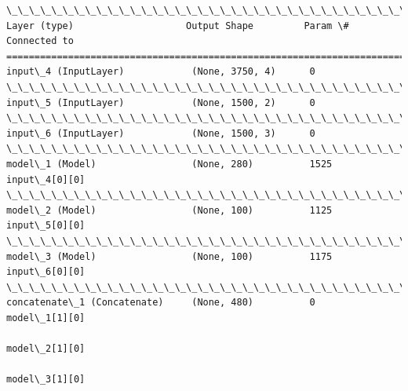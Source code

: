 \documentclass[11pt]{article}
\begin{document}
    \begin{Verbatim}[commandchars=\\\{\}]
\_\_\_\_\_\_\_\_\_\_\_\_\_\_\_\_\_\_\_\_\_\_\_\_\_\_\_\_\_\_\_\_\_\_\_\_\_\_\_\_\_\_\_\_\_\_\_\_\_\_\_\_\_\_\_\_\_\_\_\_\_\_\_\_\_\_\_\_\_\_\_\_\_\_\_\_\_\_\_\_\_\_\_\_\_\_\_\_\_\_\_\_\_\_\_\_\_\_
Layer (type)                    Output Shape         Param \#     Connected to                     
==================================================================================================
input\_4 (InputLayer)            (None, 3750, 4)      0                                            
\_\_\_\_\_\_\_\_\_\_\_\_\_\_\_\_\_\_\_\_\_\_\_\_\_\_\_\_\_\_\_\_\_\_\_\_\_\_\_\_\_\_\_\_\_\_\_\_\_\_\_\_\_\_\_\_\_\_\_\_\_\_\_\_\_\_\_\_\_\_\_\_\_\_\_\_\_\_\_\_\_\_\_\_\_\_\_\_\_\_\_\_\_\_\_\_\_\_
input\_5 (InputLayer)            (None, 1500, 2)      0                                            
\_\_\_\_\_\_\_\_\_\_\_\_\_\_\_\_\_\_\_\_\_\_\_\_\_\_\_\_\_\_\_\_\_\_\_\_\_\_\_\_\_\_\_\_\_\_\_\_\_\_\_\_\_\_\_\_\_\_\_\_\_\_\_\_\_\_\_\_\_\_\_\_\_\_\_\_\_\_\_\_\_\_\_\_\_\_\_\_\_\_\_\_\_\_\_\_\_\_
input\_6 (InputLayer)            (None, 1500, 3)      0                                            
\_\_\_\_\_\_\_\_\_\_\_\_\_\_\_\_\_\_\_\_\_\_\_\_\_\_\_\_\_\_\_\_\_\_\_\_\_\_\_\_\_\_\_\_\_\_\_\_\_\_\_\_\_\_\_\_\_\_\_\_\_\_\_\_\_\_\_\_\_\_\_\_\_\_\_\_\_\_\_\_\_\_\_\_\_\_\_\_\_\_\_\_\_\_\_\_\_\_
model\_1 (Model)                 (None, 280)          1525        input\_4[0][0]                    
\_\_\_\_\_\_\_\_\_\_\_\_\_\_\_\_\_\_\_\_\_\_\_\_\_\_\_\_\_\_\_\_\_\_\_\_\_\_\_\_\_\_\_\_\_\_\_\_\_\_\_\_\_\_\_\_\_\_\_\_\_\_\_\_\_\_\_\_\_\_\_\_\_\_\_\_\_\_\_\_\_\_\_\_\_\_\_\_\_\_\_\_\_\_\_\_\_\_
model\_2 (Model)                 (None, 100)          1125        input\_5[0][0]                    
\_\_\_\_\_\_\_\_\_\_\_\_\_\_\_\_\_\_\_\_\_\_\_\_\_\_\_\_\_\_\_\_\_\_\_\_\_\_\_\_\_\_\_\_\_\_\_\_\_\_\_\_\_\_\_\_\_\_\_\_\_\_\_\_\_\_\_\_\_\_\_\_\_\_\_\_\_\_\_\_\_\_\_\_\_\_\_\_\_\_\_\_\_\_\_\_\_\_
model\_3 (Model)                 (None, 100)          1175        input\_6[0][0]                    
\_\_\_\_\_\_\_\_\_\_\_\_\_\_\_\_\_\_\_\_\_\_\_\_\_\_\_\_\_\_\_\_\_\_\_\_\_\_\_\_\_\_\_\_\_\_\_\_\_\_\_\_\_\_\_\_\_\_\_\_\_\_\_\_\_\_\_\_\_\_\_\_\_\_\_\_\_\_\_\_\_\_\_\_\_\_\_\_\_\_\_\_\_\_\_\_\_\_
concatenate\_1 (Concatenate)     (None, 480)          0           model\_1[1][0]                    
                                                                 model\_2[1][0]                    
                                                                 model\_3[1][0]                    

\end{Verbatim}
\end{document}
